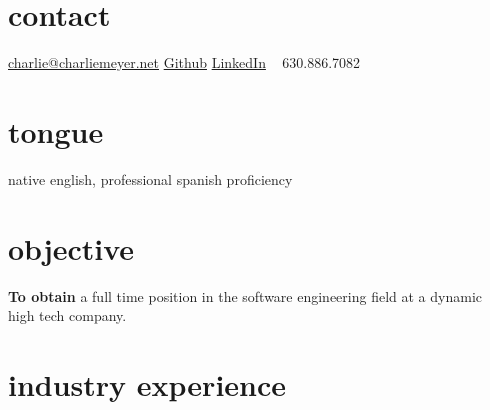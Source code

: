 \documentclass{friggeri-cv} %
\begin{document}


\begin{aside} %
\section{contact}
\href{mailto:charlie@charliemeyer.net}{charlie@charliemeyer.net}
\href{https://www.github.com/cemeyer2}{Github}
\href{www.linkedin.com/in/cemeyer2}{LinkedIn}
~
630.886.7082
~
\section{tongue}
native english,
professional spanish proficiency
\end{aside}

\section{objective}

\textbf{To obtain} a full time position in the software engineering field at a dynamic high tech company.

\section{industry experience}
\end{document}
